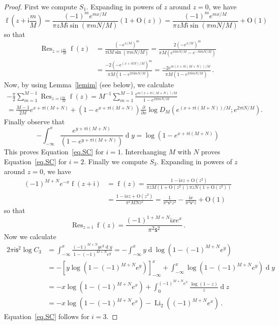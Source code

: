 \documentclass[12pt]{amsart}
\theoremstyle{definition}
\newcommand{\im}{\mathsf{i}}
\begin{document}
\begin{proof}
First we compute $S_1$. Expanding in powers of $z$ around $z=0$, we have
\begin{equation}
\operatorname{f}\left(z+\im \frac mM\right) 
=\frac{(-1)^me^{mx/M}}{\pi z M\im\sin(\pi m N/M)}\left(1+\mathrm{O}(z)\right)=
\frac{(-1)^me^{mx/M}}{\pi z M\im\sin(\pi m N/M)}+\mathrm{O}(1)
\end{equation}
so that
\begin{align*}
\operatorname{Res}_{z=\im \frac mM}\operatorname{f}(z)
&=\frac{\left(-e^{x/M}\right)^m}{\pi\im M\sin(\pi m N/M)}
=\frac{2\left(-e^{x/M}\right)^m}{
\pi M\left(e^{\pi \im m N/M}-e^{-\pi \im m N/M}\right)}\\
&=\frac{-2\left(-e^{(x+\pi\im N)/M}\right)^m}{\pi M\left(1-e^{2\pi \im m N/M}
\right)}
=\frac{-2e^{m(x+\pi\im(M+N))/M}}{\pi M\left(1-e^{2\pi \im m N/M}\right)} \,.
\end{align*}
Now, by using Lemma~\ref{lemim} (see below), we calculate
\begin{multline*}
-\frac{\pi }2 \sum_{m=1}^{M-1}
\operatorname{Res}_{z=\im \frac mM}\operatorname{f}(z)=
M^{-1}\sum_{m=1}^{M-1} \frac{e^{m(x+\pi\im(M+N))/M}}{1-e^{2\pi \im m N/M}}\\
=\frac{M-1}{2M} e^{x+\pi\im(M+N)} +\left(1-e^{x+\pi\im(M+N)}\right)
\frac{\partial}{\partial x}
\log D_M\left(e^{(x+\pi\im(M+N))/M}; e^{2\pi \im  N/M}\right).
\end{multline*}
Finally observe that
$$
-\int_{-\infty}^x  \frac{e^{y+\pi\im(M+N)}}{ \left(1-e^{y+\pi\im(M+N)}\right)}
\operatorname{d}\! y
= \log \left(1-e^{x+\pi\im(M+N)}\right)
$$
This proves Equation~\eqref{eq.SC} for $i=1$. Interchanging $M$ with $N$ 
proves Equation~\eqref{eq.SC} for $i=2$.
Finally we compute $S_3$. Expanding in powers of $z$ around $z=0$, we have
\begin{align*}
(-1)^{M+N} e^{-x} \operatorname{f}(z+\im)
&=\operatorname{f}(z)
=\frac{1-\im xz +\mathrm{O}(z^2)}{
\pi z M(1+\mathrm{O}(z^2))\pi z N(1+\mathrm{O}(z^2))}\\
&=\frac{1-\im xz +\mathrm{O}(z^2)}{\pi^2 MN z^2}
=\frac{1}{\pi^2\mathsf{s}^2 z^2} 
-\frac{\im x}{\pi^2 \mathsf{s}^2 z} +\mathrm{O}(1)
\end{align*}
so that
\begin{equation*}
\operatorname{Res}_{z=\im}\operatorname{f}(z)
=\frac{(-1)^{1+M+N}\im xe^x}{\pi^2 \mathsf{s}^2}\,.
\end{equation*}
Now we calculate
\begin{align*}
2\pi \im \mathsf{s}^2\log C_3 
&=\int_{-\infty}^x\frac{(-1)^{M+N}ye^y\operatorname{d}\! y}{1-(-1)^{M+N} e^{y}}
=-\int_{-\infty}^xy\operatorname{d}\log\left(1-(-1)^{M+N}e^y\right)\\
&=-\left[y\log\left(1-(-1)^{M+N}e^y\right)\right]_{-\infty}^{x}
+\int_{-\infty}^x\log\left(1-(-1)^{M+N}e^y\right)\operatorname{d}\! y\\
&=
-x\log\left(1-(-1)^{M+N}e^x\right)+\int_{0}^{(-1)^{M+N}e^x}
\frac{\log(1-z)}{z}\operatorname{d}\! z\\
&=
-x\log\left(1-(-1)^{M+N}e^x\right)-\operatorname{Li}_2\left((-1)^{M+N}e^x\right)
\,.
\end{align*}
Equation~\eqref{eq.SC} follows for $i=3$.
\end{proof}
\end{document}
